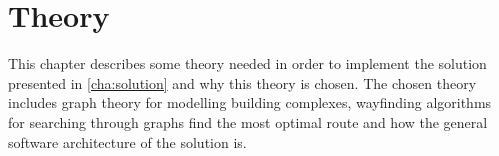 \chapter{Theory}

This chapter describes some theory needed in order to implement the solution presented in \cref{cha:solution} and why this theory is chosen. The chosen theory includes graph theory for modelling building complexes, wayfinding algorithms for searching through graphs find the most optimal route and how the general software architecture of the solution is.



%

%
%




